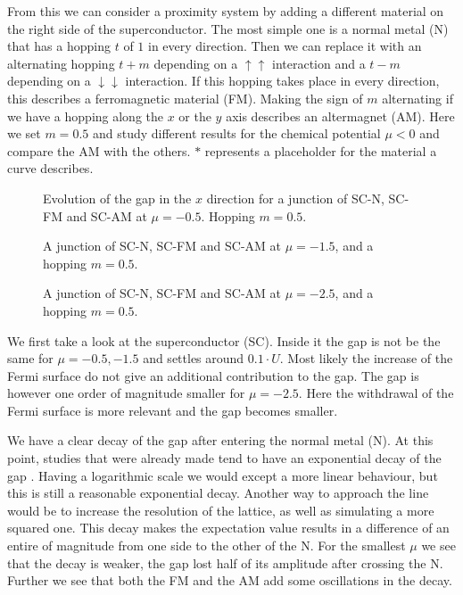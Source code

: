 \documentclass[..\main.tex]{subfile}
\begin{document}
From this we can consider a proximity system by adding a different material on the right side of the superconductor. 
The most simple one is a normal metal (N) that has a hopping $t$ of $1$ in every direction.
Then we can replace it with an alternating hopping $t+m$ depending on a $\uparrow\uparrow$ interaction
and a $t-m$ depending on a $\downarrow\downarrow$ interaction. If this hopping takes place in every direction, this describes a ferromagnetic material (FM).
Making the sign of $m$ alternating if we have a hopping along the $x$ or the $y$ axis describes an altermagnet (AM).
Here we set $m=0.5$ and study different results for the chemical potential $\mu<0$ and compare the AM
with the others. $\ast$ represents a placeholder for the material a curve describes.\\
\begin{figure}[H]
  \centering
  
  \caption{Evolution of the gap in the $x$ direction for a junction of SC-N, SC-FM and SC-AM at $\mu=-0.5$. Hopping $m=0.5$.}
  \label{fig:SC_START_Mu-0.5}
\end{figure}\begin{figure}[H]
  \centering
  
  \caption{A junction of SC-N, SC-FM and SC-AM at $\mu=-1.5$, and a hopping $m=0.5$.}
  \label{fig:SC_START_Mu-1.5}
\end{figure}
\begin{figure}[H]
  \centering
  
  \caption{A junction of SC-N, SC-FM and SC-AM at $\mu=-2.5$, and a hopping $m=0.5$.}
    \label{fig:SC_START_Mu-2.5}
\end{figure}
We first take a look at the superconductor (SC). Inside it the gap is not be the same for $\mu=-0.5,-1.5$
and settles around $0.1\cdot U$. Most likely the increase of the Fermi surface do not give an additional contribution to the gap.
The gap is however one order of magnitude smaller for $\mu=-2.5$. Here the withdrawal of the Fermi surface is more relevant and the 
gap becomes smaller.

We have a clear decay of the gap after entering the normal metal (N). At this point, 
studies that were already made tend to have an exponential decay of the gap \cite{Mjos2019}. Having a logarithmic scale we would
except a more linear behaviour, but this is still a reasonable exponential decay. Another way to approach the line would be to increase the 
resolution of the lattice, as well as simulating a more squared one. This decay makes the expectation value results in a difference of an entire
of magnitude from one side to the other of the N. For the smallest $\mu$ we see that the decay is weaker, the gap lost
half of its amplitude after crossing the N. Further we see that both the FM and the AM add some oscillations in the decay. \\
\end{document}
